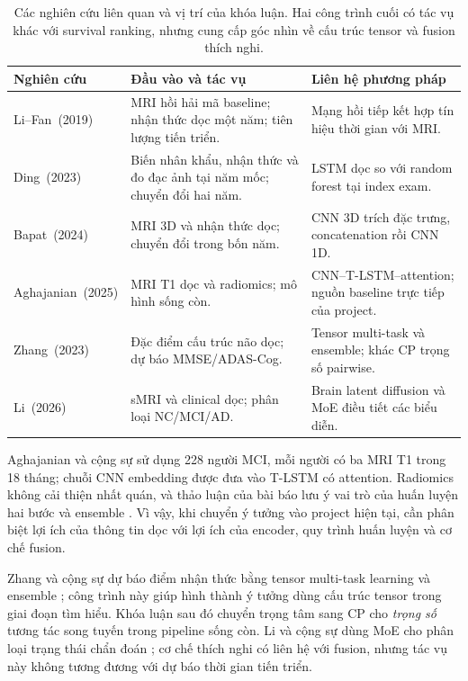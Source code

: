 \begin{table}[htbp]
\centering
\caption{Các nghiên cứu liên quan và vị trí của khóa luận. Hai công trình cuối có tác vụ khác với survival ranking, nhưng cung cấp góc nhìn về cấu trúc tensor và fusion thích nghi.}
\label{tab:related}
\small
\setlength{\tabcolsep}{4pt}
\begin{tabularx}{\textwidth}{L{3.5cm}L{4.1cm}Y}
\toprule
\textbf{Nghiên cứu} & \textbf{Đầu vào và tác vụ} & \textbf{Liên hệ phương pháp} \\
\midrule
\mbox{Li--Fan (2019)} \cite{li2019early} & MRI hồi hải mã baseline; nhận thức dọc một năm; tiên lượng tiến triển. & Mạng hồi tiếp kết hợp tín hiệu thời gian với MRI. \\
\mbox{Ding (2023)} \cite{ding2023progression} & Biến nhân khẩu, nhận thức và đo đạc ảnh tại năm mốc; chuyển đổi hai năm. & LSTM dọc so với random forest tại index exam. \\
\mbox{Bapat (2024)} \cite{bapat2024fouryear} & MRI 3D và nhận thức dọc; chuyển đổi trong bốn năm. & CNN 3D trích đặc trưng, concatenation rồi CNN 1D. \\
\mbox{Aghajanian (2025)} \cite{aghajanian2025longitudinal} & MRI T1 dọc và radiomics; mô hình sống còn. & CNN--T-LSTM--attention; nguồn baseline trực tiếp của project. \\
\mbox{Zhang (2023)} \cite{zhang2023explainable} & Đặc điểm cấu trúc não dọc; dự báo MMSE/ADAS-Cog. & Tensor multi-task và ensemble; khác CP trọng số pairwise. \\
\mbox{Li (2026)} \cite{li2026longitudinal} & sMRI và clinical dọc; phân loại NC/MCI/AD. & Brain latent diffusion và MoE điều tiết các biểu diễn. \\
\bottomrule
\end{tabularx}
\end{table}

Aghajanian và cộng sự sử dụng 228 người MCI, mỗi người có ba MRI T1 trong 18 tháng; chuỗi CNN embedding được đưa vào T-LSTM có attention. Radiomics không cải thiện nhất quán, và thảo luận của bài báo lưu ý vai trò của huấn luyện hai bước và ensemble \cite{aghajanian2025longitudinal}. Vì vậy, khi chuyển ý tưởng vào project hiện tại, cần phân biệt lợi ích của thông tin dọc với lợi ích của encoder, quy trình huấn luyện và cơ chế fusion.

Zhang và cộng sự dự báo điểm nhận thức bằng tensor multi-task learning và ensemble \cite{zhang2023explainable}; công trình này giúp hình thành ý tưởng dùng cấu trúc tensor trong giai đoạn tìm hiểu. Khóa luận sau đó chuyển trọng tâm sang CP cho \emph{trọng số} tương tác song tuyến trong pipeline sống còn. Li và cộng sự dùng MoE cho phân loại trạng thái chẩn đoán \cite{li2026longitudinal}; cơ chế thích nghi có liên hệ với fusion, nhưng tác vụ này không tương đương với dự báo thời gian tiến triển.

